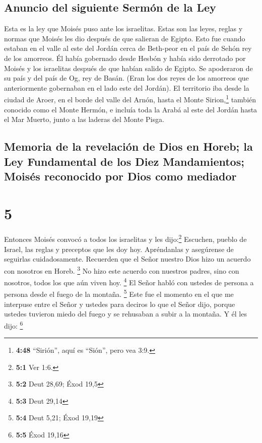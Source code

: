 \hypertarget{anuncio-del-siguiente-sermuxf3n-de-la-ley}{%
\subsection{Anuncio del siguiente Sermón de la
Ley}\label{anuncio-del-siguiente-sermuxf3n-de-la-ley}}

 Esta es la ley que Moisés puso ante los israelitas.
 Estas son las leyes, reglas y normas que Moisés les dio
después de que salieran de Egipto.  Esto fue cuando
estaban en el valle al este del Jordán cerca de Beth-peor en el país de
Sehón rey de los amorreos. Él había gobernado desde Hesbón y había sido
derrotado por Moisés y los israelitas después de que habían salido de
Egipto.  Se apoderaron de su país y del país de Og, rey
de Basán. (Eran los dos reyes de los amorreos que anteriormente
gobernaban en el lado este del Jordán).  El territorio
iba desde la ciudad de Aroer, en el borde del valle del Arnón, hasta el
Monte Sirion,\footnote{\textbf{4:48} ``Sirión'', aquí es ``Sión'', pero
  vea 3:9.} también conocido como el Monte Hermón,  e
incluía toda la Arabá al este del Jordán hasta el Mar Muerto, junto a
las laderas del Monte Pisga.

\hypertarget{memoria-de-la-revelaciuxf3n-de-dios-en-horeb-la-ley-fundamental-de-los-diez-mandamientos-moisuxe9s-reconocido-por-dios-como-mediador}{%
\subsection{Memoria de la revelación de Dios en Horeb; la Ley
Fundamental de los Diez Mandamientos; Moisés reconocido por Dios como
mediador}\label{memoria-de-la-revelaciuxf3n-de-dios-en-horeb-la-ley-fundamental-de-los-diez-mandamientos-moisuxe9s-reconocido-por-dios-como-mediador}}

\hypertarget{section-4}{%
\section{5}\label{section-4}}

 Entonces Moisés convocó a todos los israelitas y les
dijo:\footnote{\textbf{5:1} Ver 1:6.} Escuchen, pueblo de Israel, las
reglas y preceptos que les doy hoy. Apréndanlas y asegúrense de
seguirlas cuidadosamente.  Recuerden que el Señor nuestro
Dios hizo un acuerdo con nosotros en Horeb. \footnote{\textbf{5:2} Deut
  28,69; Éxod 19,5}  No hizo este acuerdo con nuestros
padres, sino con nosotros, todos los que aún viven hoy. \footnote{\textbf{5:3}
  Deut 29,14}  El Señor habló con ustedes de persona a
persona desde el fuego de la montaña. \footnote{\textbf{5:4} Deut 5,21;
  Éxod 19,19}  Este fue el momento en el que me interpuse
entre el Señor y ustedes para deciros lo que el Señor dijo, porque
ustedes tuvieron miedo del fuego y se rehusaban a subir a la montaña. Y
él les dijo: \footnote{\textbf{5:5} Éxod 19,16}

